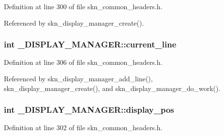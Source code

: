 Definition at line 300 of file skn\+\_\+common\+\_\+headers.\+h.



Referenced by skn\+\_\+display\+\_\+manager\+\_\+create().

\hypertarget{struct___d_i_s_p_l_a_y___m_a_n_a_g_e_r_aae8a6a90422fd9f571dff5f455740aa4}{}
\subsubsection[{current\+\_\+line}]{\setlength{\rightskip}{0pt plus 5cm}int \+\_\+\+D\+I\+S\+P\+L\+A\+Y\+\_\+\+M\+A\+N\+A\+G\+E\+R\+::current\+\_\+line}\label{struct___d_i_s_p_l_a_y___m_a_n_a_g_e_r_aae8a6a90422fd9f571dff5f455740aa4}


Definition at line 306 of file skn\+\_\+common\+\_\+headers.\+h.



Referenced by skn\+\_\+display\+\_\+manager\+\_\+add\+\_\+line(), skn\+\_\+display\+\_\+manager\+\_\+create(), and skn\+\_\+display\+\_\+manager\+\_\+do\+\_\+work().

\hypertarget{struct___d_i_s_p_l_a_y___m_a_n_a_g_e_r_aa910f0f6b6ce599a8be02853214d860c}{}
\subsubsection[{display\+\_\+pos}]{\setlength{\rightskip}{0pt plus 5cm}int \+\_\+\+D\+I\+S\+P\+L\+A\+Y\+\_\+\+M\+A\+N\+A\+G\+E\+R\+::display\+\_\+pos}\label{struct___d_i_s_p_l_a_y___m_a_n_a_g_e_r_aa910f0f6b6ce599a8be02853214d860c}


Definition at line 302 of file skn\+\_\+common\+\_\+headers.\+h.

\hypertarget{struct___d_i_s_p_l_a_y___m_a_n_a_g_e_r_a7033f795cd887063d36c11556c368e6f}{}
